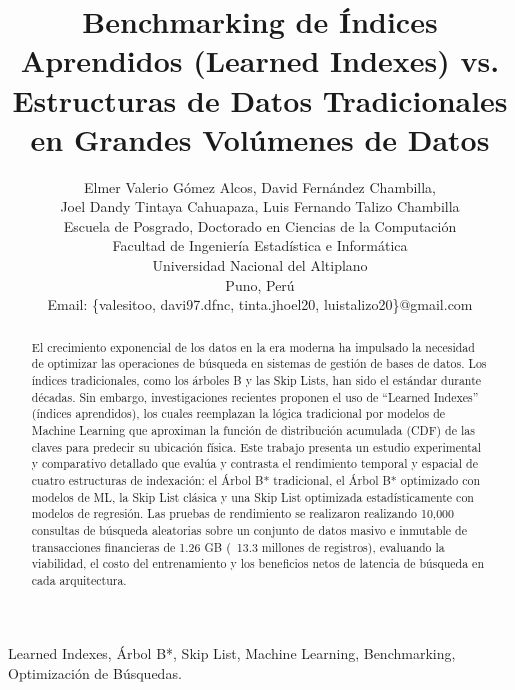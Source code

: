 \documentclass[twocolumn,10pt,journal]{IEEEtran}
\begin{document}
\title{Benchmarking de \'Indices Aprendidos (Learned Indexes) vs. Estructuras de Datos Tradicionales en Grandes Vol\'umenes de Datos}

\author{
    Elmer Valerio G\'omez Alcos, David Fern\'andez Chambilla,\\
    Joel Dandy Tintaya Cahuapaza, Luis Fernando Talizo Chambilla\\
    \small{Escuela de Posgrado, Doctorado en Ciencias de la Computaci\'on}\\
    \small{Facultad de Ingenier\'ia Estad\'istica e Inform\'atica}\\
    \small{Universidad Nacional del Altiplano}\\
    \small{Puno, Per\'u}\\
    \small{Email: \{valesitoo, davi97.dfnc, tinta.jhoel20, luistalizo20\}@gmail.com}
}

\maketitle

\begin{abstract}
El crecimiento exponencial de los datos en la era moderna ha impulsado la necesidad de optimizar las operaciones de búsqueda en sistemas de gestión de bases de datos. Los índices tradicionales, como los árboles B y las Skip Lists, han sido el estándar durante décadas. Sin embargo, investigaciones recientes proponen el uso de ``Learned Indexes'' (índices aprendidos), los cuales reemplazan la lógica tradicional por modelos de Machine Learning que aproximan la función de distribución acumulada (CDF) de las claves para predecir su ubicación física. Este trabajo presenta un estudio experimental y comparativo detallado que evalúa y contrasta el rendimiento temporal y espacial de cuatro estructuras de indexación: el Árbol B* tradicional, el Árbol B* optimizado con modelos de ML, la Skip List clásica y una Skip List optimizada estadísticamente con modelos de regresión. Las pruebas de rendimiento se realizaron realizando 10,000 consultas de búsqueda aleatorias sobre un conjunto de datos masivo e inmutable de transacciones financieras de 1.26 GB (~13.3 millones de registros), evaluando la viabilidad, el costo del entrenamiento y los beneficios netos de latencia de búsqueda en cada arquitectura.
\end{abstract}

\begin{IEEEkeywords}
Learned Indexes, \'Arbol B*, Skip List, Machine Learning, Benchmarking, Optimizaci\'on de B\'usquedas.
\end{IEEEkeywords}
\end{document}
